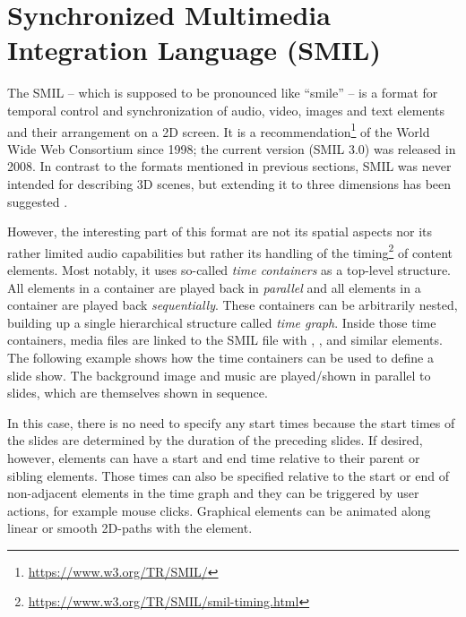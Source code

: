 


\section{Synchronized Multimedia Integration Language (SMIL)}
\label{sec:SMIL}

The SMIL --
which is supposed to be pronounced like ``smile'' --
is a format for
temporal control and synchronization of audio, video, images and text elements
and their arrangement on a 2D screen.
It is a recommendation\footnote{\url{https://www.w3.org/TR/SMIL/}}
of the World Wide Web Consortium
since 1998; the current version (SMIL 3.0) was released in 2008.
In contrast to the formats mentioned in previous sections,
SMIL was never intended for describing 3D scenes,
but extending it to three dimensions has been suggested
\parencite{goose2002streaming,pihkala2003extending}.

However,
the interesting part of this format are not its spatial aspects
nor its rather limited audio capabilities
but rather its handling of the
timing\footnote{\url{https://www.w3.org/TR/SMIL/smil-timing.html}}
of content elements.
Most notably, it uses so-called \emph{time containers}
as a top-level structure.
All elements in a  container
are played back in \emph{parallel} and
all elements in a  container
are played back \emph{sequentially}.
These containers can be arbitrarily nested,
building up a single hierarchical structure called \emph{time graph}.
Inside those time containers, media files
are linked to the SMIL file with
,
,
 and similar elements.
The following example shows how
the time containers can be used to define a slide show.
The background image and music are played/shown in parallel to slides,
which are themselves shown in sequence.



\noindent
In this case, there is no need to specify any start times
because the start times of the slides are determined
by the duration of the preceding slides.
If desired, however, elements can have a start and end time
relative to their parent or sibling elements.
Those times can also be specified
relative to the start or end of non-adjacent elements
in the time graph and they can be triggered by user actions,
for example mouse clicks.
Graphical elements can be animated along
linear or smooth 2D-paths with the  element.


